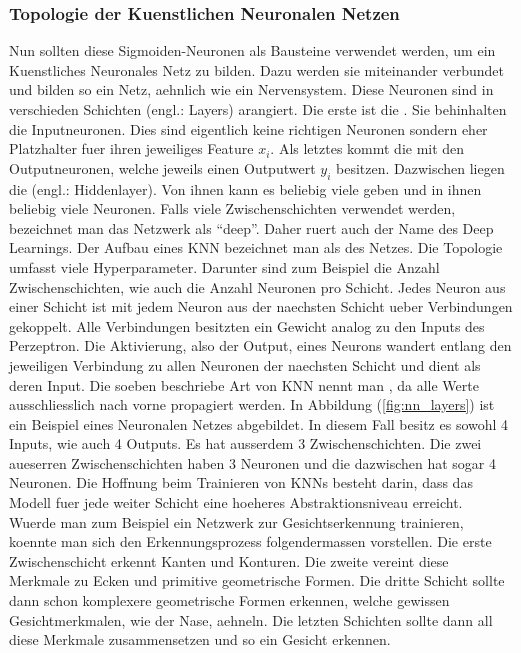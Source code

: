 \documentclass[../main]{subfiles}
\begin{document}
\subsubsection{Topologie der Kuenstlichen Neuronalen Netzen}
Nun sollten diese Sigmoiden-Neuronen als Bausteine verwendet werden, um ein Kuenstliches
Neuronales Netz zu bilden. Dazu werden sie miteinander verbundet und bilden so ein Netz,
aehnlich wie ein Nervensystem.
Diese Neuronen sind in verschieden Schichten (engl.: Layers)
arangiert. Die erste ist die . Sie behinhalten die
Inputneuronen. Dies sind eigentlich keine richtigen
Neuronen sondern eher Platzhalter fuer ihren jeweiliges Feature $x_i$. Als letztes kommt die
 mit den Outputneuronen, welche jeweils einen Outputwert $y_i$
besitzen. Dazwischen liegen die  (engl.: Hiddenlayer). Von ihnen kann es
beliebig viele geben und in ihnen beliebig viele Neuronen.
Falls viele Zwischenschichten verwendet werden, bezeichnet man das Netzwerk als
``deep''. Daher ruert auch der Name des Deep Learnings.
Der Aufbau eines KNN bezeichnet man als  des Netzes. Die
Topologie umfasst viele Hyperparameter. Darunter sind zum Beispiel die Anzahl Zwischenschichten, wie auch
die Anzahl Neuronen pro Schicht.
\para{}
Jedes Neuron aus einer Schicht ist mit jedem Neuron aus der naechsten Schicht ueber
Verbindungen gekoppelt. Alle Verbindungen besitzten ein Gewicht analog zu den Inputs des
Perzeptron. Die Aktivierung, also der Output, eines Neurons wandert entlang den jeweiligen
Verbindung zu allen Neuronen der naechsten Schicht und dient als deren Input.
Die soeben beschriebe Art von KNN nennt man , da alle Werte
ausschliesslich nach vorne propagiert werden.
\para{}
In Abbildung (\ref{fig:nn_layers}) ist ein Beispiel eines Neuronalen Netzes
abgebildet. In diesem Fall besitz es sowohl 4 Inputs, wie auch 4 Outputs. Es hat
ausserdem 3 Zwischenschichten. Die zwei aueserren Zwischenschichten haben 3 Neuronen und die dazwischen
hat sogar 4 Neuronen.
\para{}
Die Hoffnung beim Trainieren von KNNs besteht darin, dass das Modell fuer jede
weiter Schicht eine hoeheres Abstraktionsniveau erreicht. Wuerde man zum
Beispiel ein Netzwerk zur Gesichtserkennung trainieren, koennte man sich den
Erkennungsprozess folgendermassen vorstellen. Die erste Zwischenschicht erkennt
Kanten und Konturen. Die zweite vereint diese Merkmale zu Ecken und primitive
geometrische Formen. Die dritte Schicht sollte dann schon komplexere
geometrische Formen erkennen, welche gewissen Gesichtmerkmalen, wie der Nase, aehneln. Die letzten Schichten sollte dann all diese
Merkmale zusammensetzen und so ein Gesicht erkennen.
\end{document}
